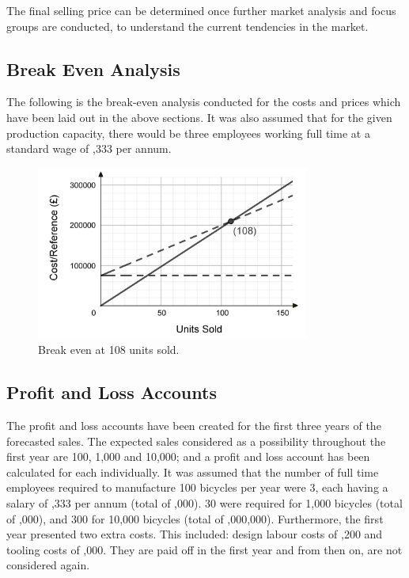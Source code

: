 \documentclass[a4paper,11pt]{article}
\begin{document}
The final selling price can be determined once further market analysis and focus groups are conducted, to understand the current tendencies in the market. 

\subsection{Break Even Analysis}

The following is the break-even analysis conducted for the costs and prices which have been laid out in the above sections. It was also assumed that for the given production capacity, there would be three employees working full time at a standard wage of ,333 per annum.

\begin{figure}[!ht]
	\centering
	\includegraphics[width=0.8\textwidth]{geg}
	\caption{Break even at 108 units sold.}
\end{figure}

\newpage

\subsection{Profit and Loss Accounts}

The profit and loss accounts have been created for the first three years of the forecasted sales. The expected sales considered as a possibility throughout the first year are 100, 1,000 and 10,000; and a profit and loss account has been calculated for each individually. It was assumed that the number of full time employees required to manufacture 100 bicycles per year were 3, each having a salary of ,333 per annum (total of ,000). 30 were required for 1,000 bicycles (total of ,000), and 300 for 10,000 bicycles (total of ,000,000). Furthermore, the first year presented two extra costs. This included: design labour costs of ,200 and tooling costs of ,000. They are paid off in the first year and from then on, are not considered again. 
\end{document}
